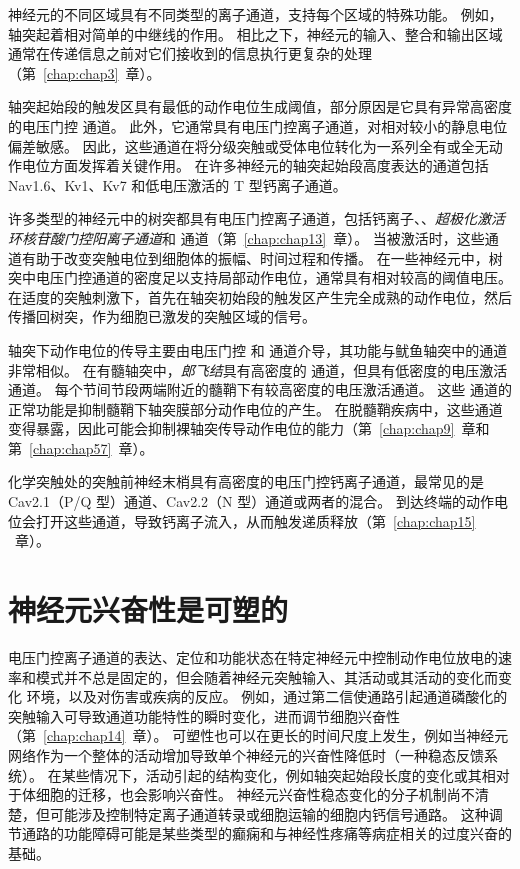 神经元的不同区域具有不同类型的离子通道，支持每个区域的特殊功能。
例如，轴突起着相对简单的中继线的作用。
相比之下，神经元的输入、整合和输出区域通常在传递信息之前对它们接收到的信息执行更复杂的处理（第~\ref{chap:chap3}~章）。


轴突起始段的触发区具有最低的动作电位生成阈值，部分原因是它具有异常高密度的电压门控  通道。
此外，它通常具有电压门控离子通道，对相对较小的静息电位偏差敏感。
因此，这些通道在将分级突触或受体电位转化为一系列全有或全无动作电位方面发挥着关键作用。
在许多神经元的轴突起始段高度表达的通道包括 Nav1.6、Kv1、Kv7 和低电压激活的 T 型钙离子通道。


许多类型的神经元中的树突都具有电压门控离子通道，包括钙离子、、\textit{超极化激活环核苷酸门控阳离子通道}和  通道（第~\ref{chap:chap13}~章）。
当被激活时，这些通道有助于改变突触电位到细胞体的振幅、时间过程和传播。
在一些神经元中，树突中电压门控通道的密度足以支持局部动作电位，通常具有相对较高的阈值电压。
在适度的突触刺激下，首先在轴突初始段的触发区产生完全成熟的动作电位，然后传播回树突，作为细胞已激发的突触区域的信号。


轴突下动作电位的传导主要由电压门控  和  通道介导，其功能与鱿鱼轴突中的通道非常相似。
在有髓轴突中，\textit{郎飞结}具有高密度的  通道，但具有低密度的电压激活  通道。
每个节间节段两端附近的髓鞘下有较高密度的电压激活通道。
这些  通道的正常功能是抑制髓鞘下轴突膜部分动作电位的产生。
在脱髓鞘疾病中，这些通道变得暴露，因此可能会抑制裸轴突传导动作电位的能力（第~\ref{chap:chap9}~章和第~\ref{chap:chap57}~章）。


化学突触处的突触前神经末梢具有高密度的电压门控钙离子通道，最常见的是 Cav2.1（P/Q 型）通道、Cav2.2（N 型）通道或两者的混合。
到达终端的动作电位会打开这些通道，导致钙离子流入，从而触发递质释放（第~\ref{chap:chap15} ~章）。



\section{神经元兴奋性是可塑的}

电压门控离子通道的表达、定位和功能状态在特定神经元中控制动作电位放电的速率和模式并不总是固定的，但会随着神经元突触输入、其活动或其活动的变化而变化 环境，以及对伤害或疾病的反应。
例如，通过第二信使通路引起通道磷酸化的突触输入可导致通道功能特性的瞬时变化，进而调节细胞兴奋性（第~\ref{chap:chap14}~章）。
可塑性也可以在更长的时间尺度上发生，例如当神经元网络作为一个整体的活动增加导致单个神经元的兴奋性降低时（一种稳态反馈系统）。
在某些情况下，活动引起的结构变化，例如轴突起始段长度的变化或其相对于体细胞的迁移，也会影响兴奋性。
神经元兴奋性稳态变化的分子机制尚不清楚，但可能涉及控制特定离子通道转录或细胞运输的细胞内钙信号通路。 
这种调节通路的功能障碍可能是某些类型的癫痫和与神经性疼痛等病症相关的过度兴奋的基础。




